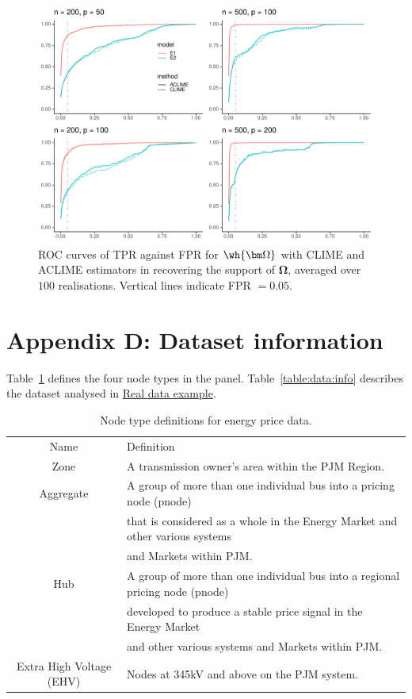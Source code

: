 \begin{figure}[htbp]
\centering
\includegraphics[width = .8\textwidth]{figs/roc_omega_aclime.pdf}
\caption{\small ROC curves of TPR against FPR for $\wh{\bm\Omega}$ with CLIME and ACLIME estimators
in recovering the support of $\bm\Omega$, averaged over $100$ realisations. Vertical lines indicate FPR $= 0.05$.}
\label{fig:roc:omega}
\end{figure}

\clearpage

\section{Appendix D: Dataset information}
\label{sec:real:data}

Table~\ref{table:definitions} defines the four node types in the panel.
Table~\ref{table:data:info} describes the dataset analysed in \hyperref[sec:real]{Real data example}. 

\begin{table}[htb]
    \caption{Node type definitions for energy price data.}
    \label{table:definitions}
{\footnotesize
    \centering
    \begin{tabular}{c l}
    \toprule
    Name & Definition \\
    \cmidrule(lr){1-1} \cmidrule(lr){2-2} 
    Zone & A transmission owner's area within the PJM Region.  \\
    Aggregate & A group of more than one individual bus into a pricing node (pnode) \\\
    & that is considered as a whole in the Energy Market and other various systems \\
    & and Markets within PJM. \\
    Hub & A group of more than one individual bus into a regional pricing node (pnode) \\
    &developed to produce a stable price signal in the Energy Market \\
    &and other various systems and Markets within PJM.\\
    Extra High Voltage (EHV) & Nodes at 345kV and above on the PJM system. \\
    \bottomrule
    \end{tabular}}
\end{table}

